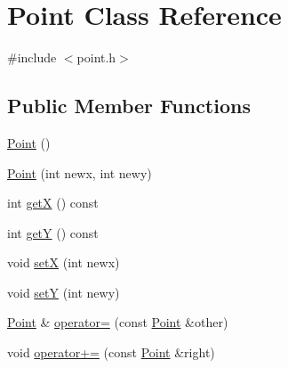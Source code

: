 \hypertarget{class_point}{}\section{Point Class Reference}
\label{class_point}


{\ttfamily \#include $<$point.\+h$>$}

\subsection*{Public Member Functions}
\begin{DoxyCompactItemize}
\item 
\hyperlink{class_point_ad92f2337b839a94ce97dcdb439b4325a}{Point} ()
\item 
\hyperlink{class_point_ad093de8201853fec77bfde7f74581e99}{Point} (int newx, int newy)
\item 
int \hyperlink{class_point_abe622fffc8785b0c2e06cdac681b9837}{getX} () const 
\item 
int \hyperlink{class_point_a10f31e48e2dbc22e3660ca769b8d5d65}{getY} () const 
\item 
void \hyperlink{class_point_af8bafa6199e19bc40ed67e177e37fb2c}{setX} (int newx)
\item 
void \hyperlink{class_point_aa9a00c4e3b5f09794ca0a760956e9b56}{setY} (int newy)
\item 
\hyperlink{class_point}{Point} \& \hyperlink{class_point_afbace8c40e1be384358cc8fc625df4da}{operator=} (const \hyperlink{class_point}{Point} \&other)
\item 
void \hyperlink{class_point_a898208563af054e37f0c7af8346c16d0}{operator+=} (const \hyperlink{class_point}{Point} \&right)
\end{DoxyCompactItemize}
